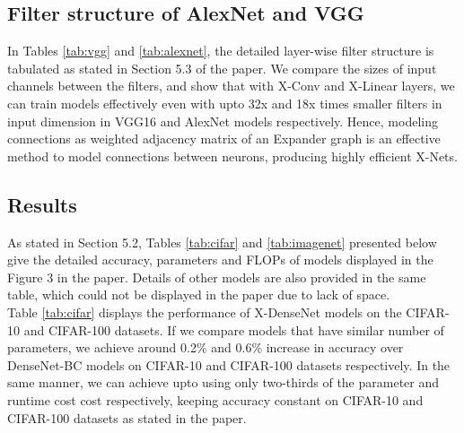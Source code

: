 \subsection{Filter structure of AlexNet and VGG}

\noindent In Tables \ref{tab:vgg} and \ref{tab:alexnet}, the detailed layer-wise filter structure is tabulated as stated in Section 5.3 of the paper. We compare the sizes of input channels between the filters, and show that with X-Conv and X-Linear layers, we can train models effectively even with upto 32x and 18x times smaller filters in input dimension in VGG16 and AlexNet models respectively. Hence, modeling connections as weighted adjacency matrix of an Expander graph is an effective method to model connections between neurons, producing highly efficient X-Nets.

\subsection{Results}
\noindent As stated in Section 5.2, Tables \ref{tab:cifar} and \ref{tab:imagenet} presented below give the detailed accuracy, parameters and FLOPs of models displayed in the Figure 3 in the paper. Details of other models are also provided in the same table, which could not be displayed in the paper due to lack of space.\\

\noindent Table \ref{tab:cifar} displays the performance of X-DenseNet models on the CIFAR-10 and CIFAR-100 datasets. If we compare models that have similar number of parameters, we achieve around 0.2\% and 0.6\% increase in accuracy over DenseNet-BC models on CIFAR-10 and CIFAR-100 datasets respectively. In the same manner, we can achieve upto using only two-thirds of the parameter and runtime cost cost respectively, keeping accuracy constant on CIFAR-10 and CIFAR-100 datasets as stated in the paper.\\

